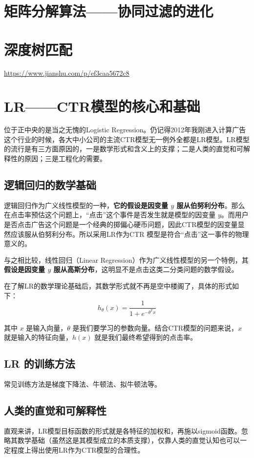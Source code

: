 \documentclass[12pt]{article}
\begin{document}
\section{矩阵分解算法——协同过滤的进化}

\section{深度树匹配}
\url{https://www.jianshu.com/p/ef3caa5672c8}

\section{LR——CTR模型的核心和基础}
位于正中央的是当之无愧的Logistic Regression。仍记得2012年我刚进入计算广告这个行业的时候，各大中小公司的主流CTR模型无一例外全都是LR模型。LR模型的流行是有三方面原因的，一是数学形式和含义上的支撑；二是人类的直觉和可解释性的原因；三是工程化的需要。

\subsection{逻辑回归的数学基础}
逻辑回归作为广义线性模型的一种，\textbf{它的假设是因变量 $y$ 服从伯努利分布}。那么在点击率预估这个问题上，“点击”这个事件是否发生就是模型的因变量 $y$。而用户是否点击广告这个问题是一个经典的掷偏心硬币问题，因此CTR模型的因变量显然应该服从伯努利分布。所以采用LR作为CTR 模型是符合“点击”这一事件的物理意义的。

与之相比较，线性回归（Linear Regression）作为广义线性模型的另一个特例，其\textbf{假设是因变量 $y$ 服从高斯分布}，这明显不是点击这类二分类问题的数学假设。

在了解LR的数学理论基础后，其数学形式就不再是空中楼阁了，具体的形式如下：
$$
h_\theta(x) = \frac{1}{1 + e^{-\theta^Tx}}
$$

其中 $x$ 是输入向量，$\theta$ 是我们要学习的参数向量。结合CTR模型的问题来说，$x$ 就是输入的特征向量，$h(x)$ 就是我们最终希望得到的点击率。

\subsection{LR 的训练方法}
常见训练方法是梯度下降法、牛顿法、拟牛顿法等。

\subsection{人类的直觉和可解释性}
直观来讲，LR模型目标函数的形式就是各特征的加权和，再施以sigmoid函数。忽略其数学基础（虽然这是其模型成立的本质支撑），仅靠人类的直觉认知也可以一定程度上得出使用LR作为CTR模型的合理性。
\end{document}
